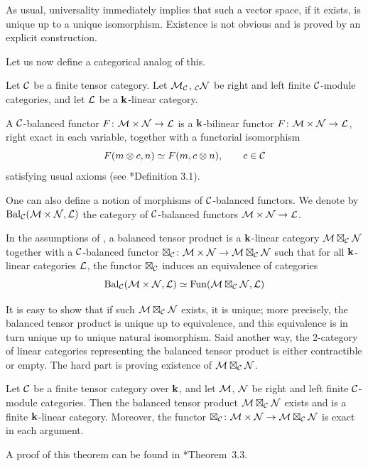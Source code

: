 As usual, universality immediately implies that such a vector space, if it
exists, is unique up to a unique isomorphism. Existence is not obvious and is
proved by an explicit construction.

Let us now define a categorical analog of this.

\begin{definition}\label{d:balanced}
  Let $\mathcal{C}$ be a finite tensor category. Let
  $\mathcal{M}_{\mathcal{C}}$, ${}_{\mathcal{C}} \mathcal{N}$ be right and left finite $\mathcal{C}$-module
  categories, and let $\mathcal{L}$ be a $\mathbf{k}$-linear category.

  A $\mathcal{C}$-balanced functor $F\colon \mathcal{M}\times \mathcal{N}\to \mathcal{L}$ is a
  $\mathbf{k}$-bilinear functor $F\colon \mathcal{M}\times \mathcal{N}\to \mathcal{L}$, right exact in
  each variable, together with a functorial isomorphism
  $$
    F(m\otimes c, n)\simeq F(m, c\otimes n), \qquad c\in \mathcal{C}
  $$
  satisfying usual axioms (see *{Definition 3.1}).
\end{definition}

One can also define a notion of morphisms of $\mathcal{C}$-balanced functors. We
denote by $\operatorname{Bal}_{\mathcal{C}}(\mathcal{M}\times \mathcal{N}, \mathcal{L})$ the category of
$\mathcal{C}$-balanced functors $\mathcal{M}\times \mathcal{N}\to \mathcal{L}$.

\begin{definition}\label{d:deligne-balanced}
  In the assumptions of , a balanced tensor product is a
  $\mathbf{k}$-linear category $\mathcal{M}\boxtimes_{\mathcal{C}} \mathcal{N}$ together with a
  $\mathcal{C}$-balanced functor $\boxtimes_{\mathcal{C}}\colon \mathcal{M}\times \mathcal{N}\to \mathcal{M}
  \boxtimes_{\mathcal{C}} \mathcal{N}$ such that for all $\mathbf{k}$-linear categories
  $\mathcal{L}$, the functor $\boxtimes_{\mathcal{C}}$
  induces an equivalence of categories
  $$
    \operatorname{Bal}_{\mathcal{C}}(\mathcal{M}\times \mathcal{N}, \mathcal{L})\simeq
    \operatorname{Fun}(\mathcal{M}\boxtimes_{\mathcal{C}} \mathcal{N}, \mathcal{L})
  $$
\end{definition}
It is easy to show that if such $\mathcal{M}\boxtimes_{\mathcal{C}} \mathcal{N}$ exists, it is
unique; more precisely, the balanced tensor product is unique up to equivalence,
and this equivalence is in turn unique up to unique natural isomorphism. Said
another way, the 2-category of linear categories representing the balanced
tensor product is either contractible or empty. The hard part is proving
existence of $\mathcal{M}\boxtimes_{\mathcal{C}} \mathcal{N}$.

\begin{theorem}\label{t:deligne-balanced}
  Let $\mathcal{C}$ be a finite tensor category over $\mathbf{k}$, and let $\mathcal{M}$, $\mathcal{N}$
  be right and left finite $\mathcal{C}$-module categories. Then the balanced tensor
  product $\mathcal{M}\boxtimes_{\mathcal{C}}\mathcal{N}$ exists and is a finite $\mathbf{k}$-linear
  category. Moreover, the functor $\boxtimes_{\mathcal{C}}\colon \mathcal{M}\times\mathcal{N}\to
  \mathcal{M}\boxtimes_{\mathcal{C}}\mathcal{N}$ is exact in each argument.
\end{theorem}
A proof of this theorem can be found in *{Theorem~3.3}.

